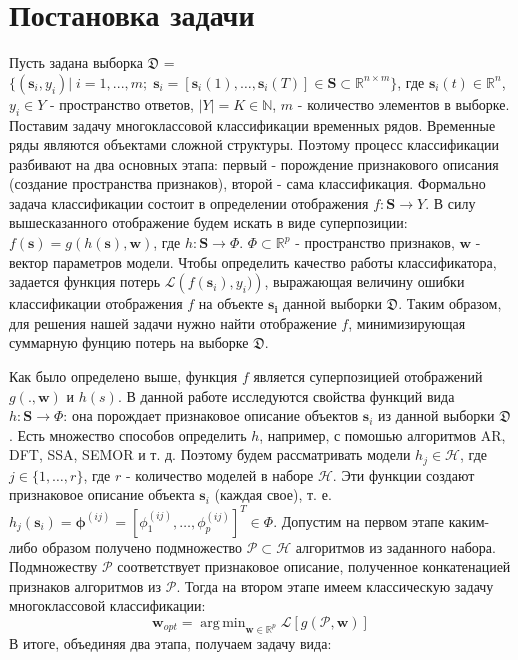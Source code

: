 \documentclass[12pt,twoside]{article}
\DeclareMathOperator*{\argmin}{arg\,min}
\begin{document}
\section{Постановка задачи}
Пусть задана выборка 
$\mathfrak{D}$ = $\{(\mathbf{s}_i,y_i)|\; i=1,...,m;\; \mathbf{s}_i = [\mathbf{s}_i(1), \dots ,\mathbf{s}_i(T) ] \in \mathbf{S} \subset \mathbb{R}^{n\times m} \}$, где $\mathbf{s}_i(t) \in \mathbb{R}^n$, $ y_i \in Y$ - пространство ответов, $|Y| = K \in \mathbb{N}$, $m$ - количество элементов в выборке. Поставим задачу многоклассовой классификации временных рядов. Временные ряды  являются объектами сложной структуры. Поэтому процесс классификации разбивают на два основных этапа: первый - порождение признакового описания (создание пространства признаков), второй - сама классификация. Формально задача классификации состоит в определении отображения $f: \mathbf{S} \rightarrow Y$. В силу вышесказанного отображение будем искать в виде суперпозиции: $f(\mathbf{s}) = g(h(\mathbf{s}), \mathbf{w})$, где $h: \mathbf{S} \rightarrow \Phi$. $\Phi \subset \mathbb{R}^p$ - пространство признаков, $\mathbf{w}$ - вектор параметров модели. Чтобы определить качество работы классификатора, задается функция потерь $\mathcal{L}\left(f(\mathbf{s}_i), y_i)\right)$, выражающая величину ошибки классификации отображения $f$ на объекте $\mathbf{s_i}$ данной выборки $\mathfrak{D}$. Таким образом, для решения нашей задачи нужно найти отображение $f$, минимизирующая суммарную фунцию потерь на выборке $\mathfrak{D}$.


Как было определено выше, функция $f$ является суперпозицией отображений $g(. , \mathbf{w})$ и $h(s)$. В данной работе исследуются свойства функций вида  $h: \mathbf{S} \rightarrow \Phi$: она порождает признаковое описание объектов $\mathbf{s}_i$ из данной выборки $\mathfrak{D}$.  Есть множество способов определить $h$, например, с помошью алгоритмов AR, DFT, SSA, SEMOR и т. д. Поэтому будем рассматривать модели $h_j \in \mathcal{H}$, где $j \in \{1, \dots, r\}$, где $r$  - количество моделей в наборе $\mathcal{H}$. Эти функции создают признаковое описание объекта $\mathbf{s}_i$ (каждая свое),  т. е.
$h_j(\mathbf{s}_i)  = \boldsymbol{\phi}^{(i j)} =[\phi_{1}^{(i j)}, \dots, \phi_{p}^{(i j)}] ^T \in \Phi$. 
Допустим на первом этапе каким-либо образом получено подмножество $\mathcal{P} \subset \mathcal{H}$ алгоритмов из заданного набора. Подмножеству $\mathcal{P}$ соответствует признаковое описание, полученное конкатенацией признаков алгоритмов из $\mathcal{P}$. Тогда на втором этапе имеем классическую задачу многоклассовой классификации:
\begin{equation}
\mathbf{w}_{opt} = \argmin_{\mathbf{w} \in \mathbb{R}^p} \mathcal{L}[g(\mathcal{P}, \mathbf{w})]
\end{equation}
В итоге, объединяя два этапа, получаем задачу вида:
\end{document}
